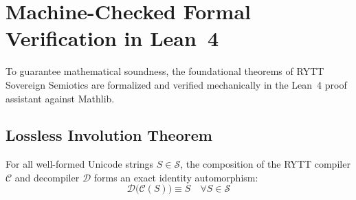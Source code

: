 \documentclass[11pt,oneside,letterpaper]{article}
\theoremstyle{definition}
\begin{document}
\section{Machine-Checked Formal Verification in Lean~4}

To guarantee mathematical soundness, the foundational theorems of RYTT Sovereign Semiotics are formalized and verified mechanically in the Lean~4 proof assistant against Mathlib.

\subsection{Lossless Involution Theorem}
\begin{theorem}
For all well-formed Unicode strings $S \in \mathcal{S}$, the composition of the RYTT compiler $\mathcal{C}$ and decompiler $\mathcal{D}$ forms an exact identity automorphism:
\begin{equation}
\mathcal{D}\big(\mathcal{C}(S)\big) \equiv S \quad \forall S \in \mathcal{S}
\end{equation}
\end{theorem}
\end{document}
